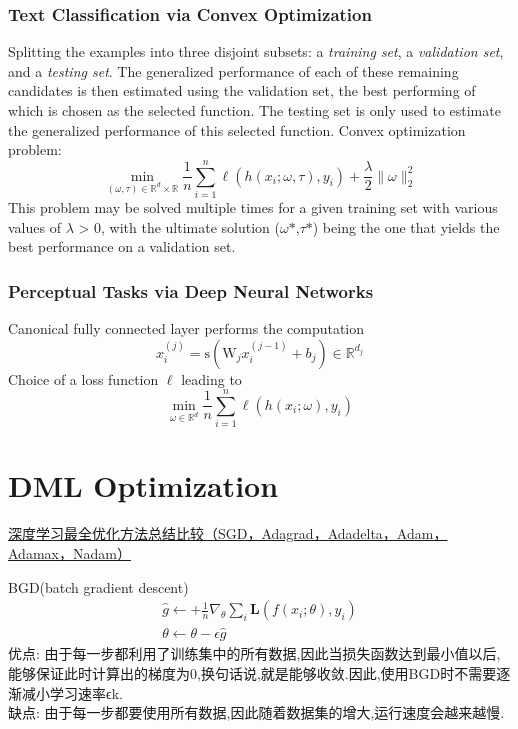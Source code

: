 \documentclass[hyperref, UTF-8]{ctexart}
\begin{document}
\subsubsection{Text Classification via Convex Optimization}
Splitting the examples into three disjoint subsets: a \emph{training set}, a \emph{validation set}, and a \emph{testing set}. 
The generalized performance of each of these remaining candidates is then estimated using the validation set, the best performing of which is chosen as the selected function. The testing set is only used to estimate the generalized performance of this selected function.
Convex optimization problem:
\begin{equation}
  \min_{(\omega,\tau)\in \mathbb{R}^d\times \mathbb{R}}\frac{1}{n}\sum_{i=1}^{n}\ell(h(x_i;\omega,\tau),y_i) + \frac{\lambda}{2}\parallel\omega\parallel_2^2
\end{equation}
This problem may be solved multiple times for a given training set with various values of $\lambda$ > 0, with the ultimate solution ($\omega${$\ast$},$\tau${$\ast$}) being the one that yields the best performance on a validation set.

\subsubsection{Perceptual Tasks via Deep Neural Networks}
Canonical fully connected layer performs the computation
\begin{equation}
  x_i^{(j)} = \mathrm{ s }(\mathrm{ W }_j x_i^{(j-1)}+b_j) \in \mathbb{R}^{d_j}
\end{equation}
Choice of a loss function $\ell$ leading to
\begin{equation}
  \min_{\omega\in\mathbb{R}^d} \frac{1}{n} \sum_{i=1}^n \ell(h(x_i;\omega), y_i)
\end{equation}

\section{DML Optimization}
\href{https://zhuanlan.zhihu.com/p/22252270}{深度学习最全优化方法总结比较（SGD，Adagrad，Adadelta，Adam，Adamax，Nadam）}

BGD(batch gradient descent)
\begin{eqnarray*}
  \hat{g} \leftarrow + \frac{1}{n} \nabla_{\theta}\sum_i
  \mathbf{L}(f(x_i;\theta),y_i) \\
  \theta \leftarrow \theta - \epsilon \hat{g}
\end{eqnarray*}
优点: 由于每一步都利用了训练集中的所有数据,因此当损失函数达到最小值以后,能够保证此时计算出的梯度为0,换句话说,就是能够收敛.因此,使用BGD时不需要逐渐减小学习速率ϵk. \\
缺点: 由于每一步都要使用所有数据,因此随着数据集的增大,运行速度会越来越慢.
\end{document}
